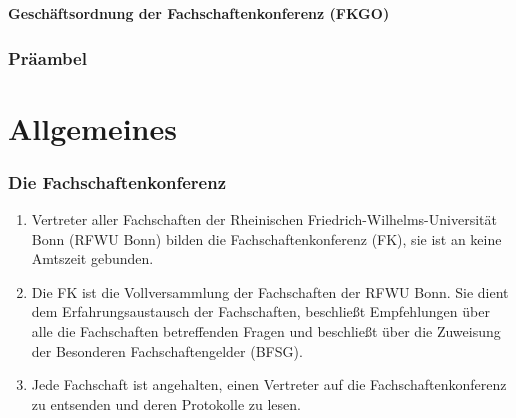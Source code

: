 \documentclass{article}
\begin{document}
\noindent
\begin{center}
    \huge \textbf{Geschäftsordnung der Fachschaftenkonferenz (FKGO)}
\end{center}

\section*{Präambel}
\noindent

\part{Allgemeines}
\section{Die Fachschaftenkonferenz}
\begin{enumerate}[(1)]
    \item Vertreter aller Fachschaften der Rheinischen Friedrich-Wilhelms-Universität Bonn (RFWU Bonn) bilden die Fachschaftenkonferenz (FK), sie ist an keine Amtszeit gebunden.
    \item Die FK ist die Vollversammlung der Fachschaften der RFWU Bonn.
    	Sie dient dem Erfahrungsaustausch der Fachschaften, beschließt Empfehlungen über alle die Fachschaften betreffenden Fragen und beschließt über die Zuweisung der Besonderen Fachschaftengelder (BFSG).
    \item Jede Fachschaft ist angehalten, einen Vertreter auf die Fachschaftenkonferenz zu entsenden und deren Protokolle zu lesen.
\end{enumerate}
\end{document}
